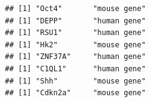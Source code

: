 \documentclass[]{book}
\newenvironment{Shaded}{\begin{snugshade}}{\end{snugshade}}
\newcommand{\CommentTok}[1]{\textcolor[rgb]{0.56,0.35,0.01}{\textit{#1}}}
\newcommand{\ControlFlowTok}[1]{\textcolor[rgb]{0.13,0.29,0.53}{\textbf{#1}}}
\newcommand{\DataTypeTok}[1]{\textcolor[rgb]{0.13,0.29,0.53}{#1}}
\newcommand{\KeywordTok}[1]{\textcolor[rgb]{0.13,0.29,0.53}{\textbf{#1}}}
\newcommand{\NormalTok}[1]{#1}
\newcommand{\StringTok}[1]{\textcolor[rgb]{0.31,0.60,0.02}{#1}}
\begin{document}
\begin{Shaded}
\end{Shaded}

\begin{verbatim}
## [1] "Oct4"       "mouse gene"
## [1] "DEPP"       "human gene"
## [1] "RSU1"       "human gene"
## [1] "Hk2"        "mouse gene"
## [1] "ZNF37A"     "human gene"
## [1] "C1QL1"      "human gene"
## [1] "Shh"        "mouse gene"
## [1] "Cdkn2a"     "mouse gene"
\end{verbatim}


\end{document}
